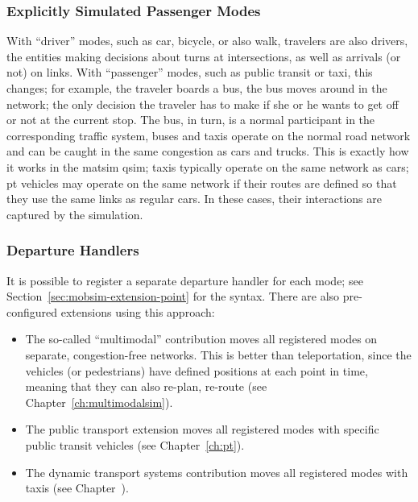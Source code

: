 \subsubsection{Explicitly Simulated Passenger Modes}



With ``driver'' modes, such as car, bicycle, or also walk,  travelers are also drivers, \ie the entities making decisions about turns at intersections, as well as arrivals (or not) on links.
%
With ``passenger'' modes, such as public transit or taxi, this changes; for example, the traveler boards a bus, the bus moves around in the network; the only decision the traveler has to make if she or he wants to get off or not at the current stop.  The bus, in turn, is a normal participant in the corresponding traffic system, \ie buses and taxis operate on the normal road network and can be caught in the same congestion as cars and trucks.  
%
This is exactly how it works in the \gls{matsim} \gls{qsim}; taxis typically operate on the same network as cars; pt vehicles may operate on the same network if their routes are defined so that they use the same links as regular cars. 
In these cases, their interactions are captured by the simulation. 


\subsubsection{Departure Handlers}
\label{sec:departure-handlers}
It is possible to register a separate departure handler for each mode; see Section~\ref{sec:mobsim-extension-point} for the syntax.  There are also pre-configured extensions using this approach:
%
\begin{itemize}\styleItemize

\item The so-called ``multimodal'' contribution moves all registered modes on separate, congestion-free networks.  This is better than \gls{teleportation}, since the vehicles (or pedestrians) have defined positions at each point in time, meaning that they can also re-plan, \eg re-route (see Chapter~\ref{ch:multimodalsim}).

\item The public transport extension moves all registered modes with specific public transit vehicles (see Chapter~\ref{ch:pt}).

\item The dynamic transport systems contribution moves all registered modes  with taxis (see Chapter~\pageref{ch:dts}).

\end{itemize}

